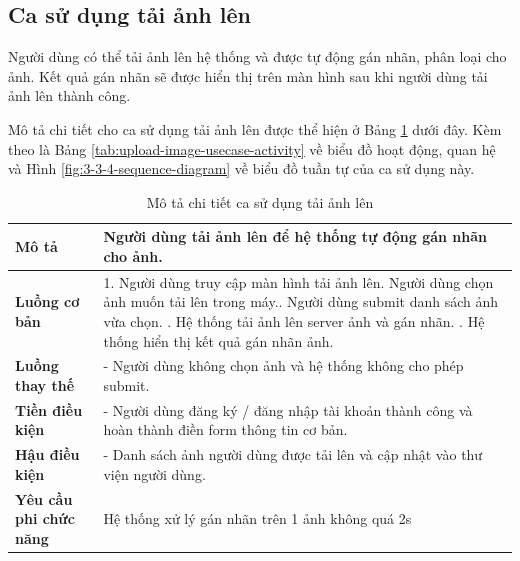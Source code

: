 \subsection{Ca sử dụng tải ảnh lên}

Người dùng có thể tải ảnh lên hệ thống và được tự động gán nhãn, phân loại cho ảnh. Kết quả gán nhãn sẽ được hiển thị trên màn hình sau khi người dùng tải ảnh lên thành công.

Mô tả chi tiết cho ca sử dụng tải ảnh lên được thể hiện ở Bảng \ref{tab:upload-image-usecase} dưới đây. Kèm theo là Bảng \ref{tab:upload-image-usecase-activity} về biểu đồ hoạt động, quan hệ và Hình \ref{fig:3-3-4-sequence-diagram} về biểu đồ tuần tự của ca sử dụng này. 

\noindent 

\begin{table}[H]
\centering
\caption{Mô tả chi tiết ca sử dụng tải ảnh lên}
\label{tab:upload-image-usecase}
\begin{tabularx}{\linewidth}{| l | X |} 
\hline 
\textbf{Mô tả} & Người dùng tải ảnh lên để hệ thống tự động gán nhãn cho ảnh. \\
\hline 
\textbf{Luồng cơ bản} & 1. Người dùng truy cập màn hình tải ảnh lên\newline
                       2. Người dùng chọn ảnh muốn tải lên trong máy.\newline
                       3. Người dùng submit danh sách ảnh vừa chọn. \newline
                       4. Hệ thống tải ảnh lên server ảnh và gán nhãn. \newline
                       5. Hệ thống hiển thị kết quả gán nhãn ảnh. \\
\hline 
\textbf{Luồng thay thế} &
                       - Người dùng không chọn ảnh và hệ thống không cho phép submit. \\ 
\hline 
\textbf{Tiền điều kiện} & - Người dùng đăng ký / đăng nhập tài khoản thành công và hoàn thành điền form thông tin cơ bản. \\
\hline 
\textbf{Hậu điều kiện} & - Danh sách ảnh người dùng được tải lên và cập nhật vào thư viện người dùng. \\
\hline 
\textbf{Yêu cầu phi chức năng} & Hệ thống xử lý gán nhãn trên 1 ảnh không quá 2s \\
\hline 
\end{tabularx}
\end{table}

\vspace{0.8cm}

